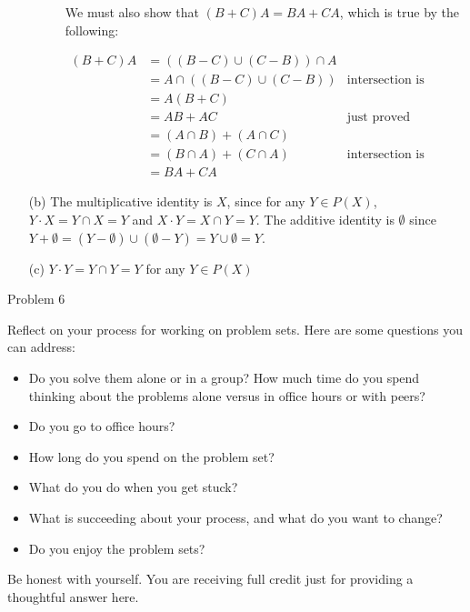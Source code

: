 \documentclass{hmwk}
\begin{document}
\begin{solution}
\begin{itemize}
\begin{description}
        We must also show that $(B+C)A = BA + CA$, which is true by the following:

        \begin{align*}
            (B+C)A &= ((B - C) \cup (C - B)) \cap A \\
            &= A \cap ((B - C) \cup (C - B)) & \text{intersection is commutative}\\
            &= A(B+C) \\
            &= AB + AC & \text{just proved}\\
            &= (A \cap B) + (A \cap C) \\
            &= (B \cap A) + (C \cap A) & \text{intersection is commutative}\\
            &= BA + CA
        \end{align*}
    \end{description}
    
    \item[(b)] The multiplicative identity is $X$, since for any $Y \in P(X)$, $Y \cdot X = Y \cap X = Y$ and $X \cdot Y = X \cap Y = Y$. The additive identity is $\emptyset$ since $Y + \emptyset = (Y - \emptyset) \cup (\emptyset - Y) = Y \cup \emptyset = Y$.
    \item[(c)] $Y \cdot Y = Y \cap Y = Y$ for any $Y \in P(X)$
\end{itemize}
\end{solution}

\begin{problem}{Problem 6}

\pre Reflect on your process for working on problem sets.  Here are some questions you can address:

\begin{itemize}
	\item Do you solve them alone or in a group? How much time do you spend thinking about the problems alone versus in office hours or with peers? 
	\item Do you go to office hours? 
	\item How long do you spend on the problem set? 
	\item What do you do when you get stuck?
	\item  What is succeeding about your process, and what do you want to change?
	\item Do you enjoy the problem sets?
\end{itemize}
	 Be honest with yourself. You are receiving full credit just for providing a thoughtful answer here.
    
\end{problem}
\end{document}
